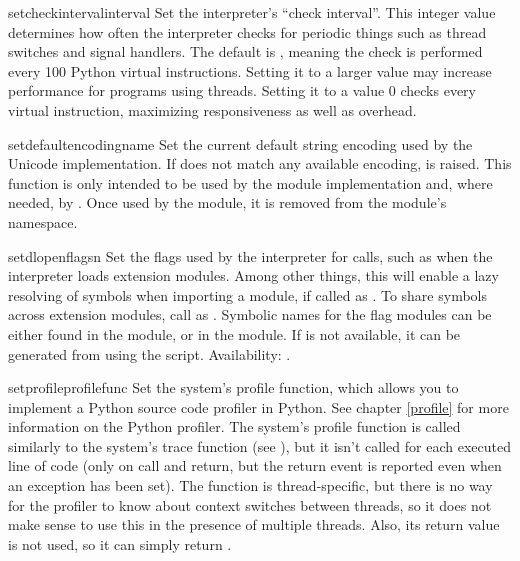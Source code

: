 \begin{funcdesc}{setcheckinterval}{interval}
  Set the interpreter's ``check interval''.  This integer value
  determines how often the interpreter checks for periodic things such
  as thread switches and signal handlers.  The default is ,
  meaning the check is performed every 100 Python virtual instructions.
  Setting it to a larger value may increase performance for programs
  using threads.  Setting it to a value \code{<=} 0 checks every
  virtual instruction, maximizing responsiveness as well as overhead.
\end{funcdesc}

\begin{funcdesc}{setdefaultencoding}{name}
  Set the current default string encoding used by the Unicode
  implementation.  If  does not match any available
  encoding,  is raised.  This function is only
  intended to be used by the  module implementation
  and, where needed, by .  Once used by the
   module, it is removed from the 
  module's namespace.
\end{funcdesc}

\begin{funcdesc}{setdlopenflags}{n}
  Set the flags used by the interpreter for 
  calls, such as when the interpreter loads extension modules.  Among
  other things, this will enable a lazy resolving of symbols when
  importing a module, if called as .  To
  share symbols across extension modules, call as
  .  Symbolic
  names for the flag modules can be either found in the 
  module, or in the  module. If  is not
  available, it can be generated from 
  using the  script.
  Availability: \UNIX.
\end{funcdesc}

\begin{funcdesc}{setprofile}{profilefunc}
  Set the system's profile function, which
  allows you to implement a Python source code profiler in
  Python.  See chapter \ref{profile} for more
  information on the Python profiler.  The system's profile function
  is called similarly to the system's trace function (see
  ), but it isn't called for each executed line
  of code (only on call and return, but the return event is reported
  even when an exception has been set).  The function is
  thread-specific, but there is no way for the profiler to know about
  context switches between threads, so it does not make sense to use
  this in the presence of multiple threads.
  Also, its return value is not used, so it can simply return
  .
\end{funcdesc}

